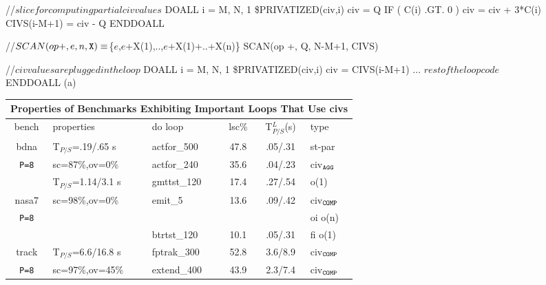 \documentclass[10pt,nocopyrightspace]{sigplanconf}
\newcommand{\mymath}[1]{$ #1 $}
\begin{document}
\begin{figure*}
\begin{minipage}{1.0\columnwidth}
\begin{colorcode}
//\mymath{slice for computing partial civ values}
DOALL i = M, N, 1      \$PRIVATIZED(civ,i)
  civ = Q
  IF ( C(i) .GT. 0 ) civ = civ + 3*C(i)
  CIVS(i-M+1) = civ - Q
ENDDOALL

//\mymath{SCAN(op{\tt{}+},e,n,{\tt{}X})\equiv}\{\mymath{e},\mymath{e}+X(1),..,\mymath{e}+X(1)+..+X(n)\}
SCAN(op +, Q, N-M+1, CIVS)

//\mymath{civ values are plugged in the loop} 
DOALL i = M, N, 1      \$PRIVATIZED(civ,i)
  civ = CIVS(i-M+1)
  ... \mymath{rest of the loop code} 
ENDDOALL
                (a)
\end{colorcode}
\end{minipage}
%
\begin{minipage}{1.02\columnwidth}
\centering
\scriptsize   
\begin{tabular}{|c|l|l|c|c|l|} \hline
\multicolumn{6}{|c|}{Properties of Benchmarks Exhibiting Important Loops That Use {\sc civ}s} \\ \hline
{\sc bench} & {\sc properties} & {\sc do loop}  & {\sc lsc}\%  & T$_{P/S}^L$(s) & {\sc type} \\ \hline
{\sc bdna}  &  T$_{P/S}$=.19/.65 s         & {\sc actfor\_500}  & 47.8 & .05/.31 & {\sc st-par}     \\ 
{\tt P=8}         &  {\sc sc}=87\%,{\sc ov}=0\%  & {\sc actfor\_240}  & 35.6 & .04/.23 & {\sc civ}$_{\tt{}AGG}$    \\ \hline 
             &  T$_{P/S}$=1.14/3.1 s         & {\sc gmttst\_120}  & 17.4 & .27/.54 & {\sc {\sc fi} {\sc o(1)}}   \\ 
{\sc nasa7}  &  {\sc sc}=98\%,{\sc ov}=0\%  & {\sc emit\_5}      & 13.6 & .09/.42 & {\sc civ}$_{\tt{}COMP}$   \\  %
{\tt P=8}        &                              &                      &                & & {\sc oi} {\sc o(n)}       \\
             &                              & {\sc btrtst\_120}  & 10.1 & .05/.31 & {\sc fi} {\sc o(1)}        \\ \hline
{\sc track}  &  T$_{P/S}$=6.6/16.8 s         & {\sc fptrak\_300}  & 52.8 & 3.6/8.9 & {\sc civ}$_{\tt{}COMP}$   \\ 
{\tt P=8}        &  {\sc sc}=97\%,{\sc ov}=45\%  & {\sc extend\_400}  & 43.9 & 2.3/7.4 & {\sc civ}$_{\tt{}COMP}$ \\ \hline 

\end{tabular}
\end{minipage}
\end{figure*}
\end{document}
